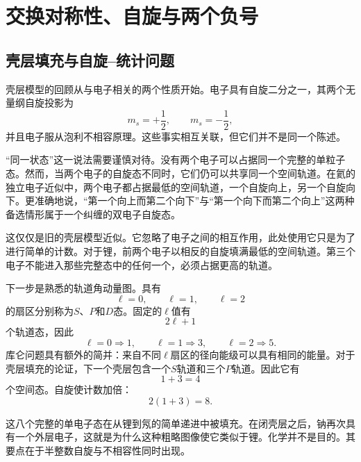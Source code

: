 \chapter{交换对称性、自旋与两个负号}

\section{壳层填充与自旋--统计问题}

壳层模型的回顾从与电子相关的两个性质开始。电子具有自旋二分之一，其两个无量纲自旋投影为
\begin{equation}
m_s=+\frac12,
\qquad
m_s=-\frac12,
\end{equation}
并且电子服从泡利不相容原理。这些事实相互关联，但它们并不是同一个陈述。

``同一状态''这一说法需要谨慎对待。没有两个电子可以占据同一个完整的单粒子态。然而，当两个电子的自旋态不同时，它们仍可以共享同一个空间轨道。在氦的独立电子近似中，两个电子都占据最低的空间轨道，一个自旋向上，另一个自旋向下。更准确地说，``第一个向上而第二个向下''与``第一个向下而第二个向上''这两种备选情形属于一个纠缠的双电子自旋态。

这仅仅是旧的壳层模型近似。它忽略了电子之间的相互作用，此处使用它只是为了进行简单的计数。对于锂，前两个电子以相反的自旋填满最低的空间轨道。第三个电子不能进入那些完整态中的任何一个，必须占据更高的轨道。

下一步是熟悉的轨道角动量图。具有
\begin{equation}
\ell=0,\qquad \ell=1,\qquad \ell=2
\end{equation}
的扇区分别称为\(S\)、\(P\)和\(D\)态。固定的\(\ell\)值有
\begin{equation}
2\ell+1
\end{equation}
个轨道态，因此
\begin{equation}
\ell=0\Rightarrow 1,
\qquad
\ell=1\Rightarrow 3,
\qquad
\ell=2\Rightarrow 5.
\end{equation}
库仑问题具有额外的简并：来自不同\(\ell\)扇区的径向能级可以具有相同的能量。对于壳层填充的论证，下一个壳层包含一个\(S\)轨道和三个\(P\)轨道。因此它有
\begin{equation}
1+3=4
\end{equation}
个空间态。自旋使计数加倍：
\begin{equation}
2(1+3)=8.
\end{equation}

这八个完整的单电子态在从锂到氖的简单递进中被填充。在闭壳层之后，钠再次具有一个外层电子，这就是为什么这种粗略图像使它类似于锂。化学并不是目的。其要点在于半整数自旋与不相容性同时出现。

